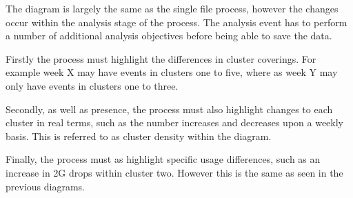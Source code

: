 The diagram is largely the same as the single file process, however the changes 
occur within the analysis stage of the process. The analysis event has to 
perform a number of additional analysis objectives before being able to save 
the data.

Firstly the process must highlight the differences in cluster coverings. For 
example week X may have events in clusters one to five, where as week Y may 
only have events in clusters one to three. 

Secondly, as well as presence, the process must also highlight changes to each 
cluster in real terms, such as the number increases and decreases upon a weekly 
basis. This is referred to as cluster density within the diagram.

Finally, the process must as highlight specific usage differences, such as an 
increase in 2G drops within cluster two. However this is the same as seen in 
the previous diagrams.




